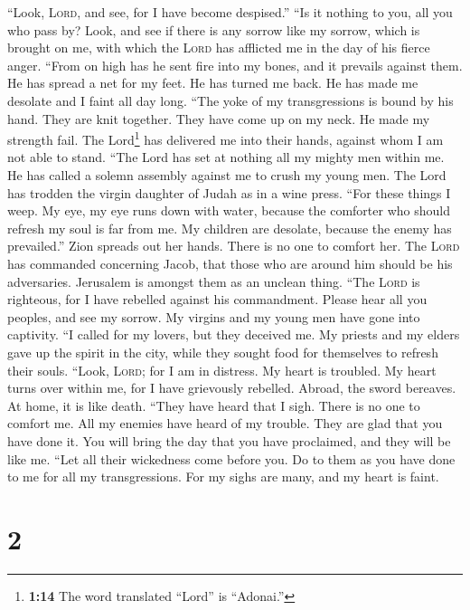 ``Look, \textsc{Lord}, and see, for I have become despised.''
 ``Is it nothing to you, all you who pass by? Look, and
see if there is any sorrow like my sorrow, which is brought on me, with
which the \textsc{Lord} has afflicted me in the day of his fierce anger.
 ``From on high has he sent fire into my bones, and it
prevails against them. He has spread a net for my feet. He has turned me
back. He has made me desolate and I faint all day long. 
``The yoke of my transgressions is bound by his hand. They are knit
together. They have come up on my neck. He made my strength fail. The
Lord\footnote{\textbf{1:14} The word translated ``Lord'' is ``Adonai.''}
has delivered me into their hands, against whom I am not able to stand.
 ``The Lord has set at nothing all my mighty men within
me. He has called a solemn assembly against me to crush my young men.
The Lord has trodden the virgin daughter of Judah as in a wine press.
 ``For these things I weep. My eye, my eye runs down with
water, because the comforter who should refresh my soul is far from me.
My children are desolate, because the enemy has prevailed.''
 Zion spreads out her hands. There is no one to comfort
her. The \textsc{Lord} has commanded concerning Jacob, that those who
are around him should be his adversaries. Jerusalem is amongst them as
an unclean thing.  ``The \textsc{Lord} is righteous, for
I have rebelled against his commandment. Please hear all you peoples,
and see my sorrow. My virgins and my young men have gone into captivity.
 ``I called for my lovers, but they deceived me. My
priests and my elders gave up the spirit in the city, while they sought
food for themselves to refresh their souls.  ``Look,
\textsc{Lord}; for I am in distress. My heart is troubled. My heart
turns over within me, for I have grievously rebelled. Abroad, the sword
bereaves. At home, it is like death.  ``They have heard
that I sigh. There is no one to comfort me. All my enemies have heard of
my trouble. They are glad that you have done it. You will bring the day
that you have proclaimed, and they will be like me. 
``Let all their wickedness come before you. Do to them as you have done
to me for all my transgressions. For my sighs are many, and my heart is
faint.

\hypertarget{section-1}{%
\section{2}\label{section-1}}

